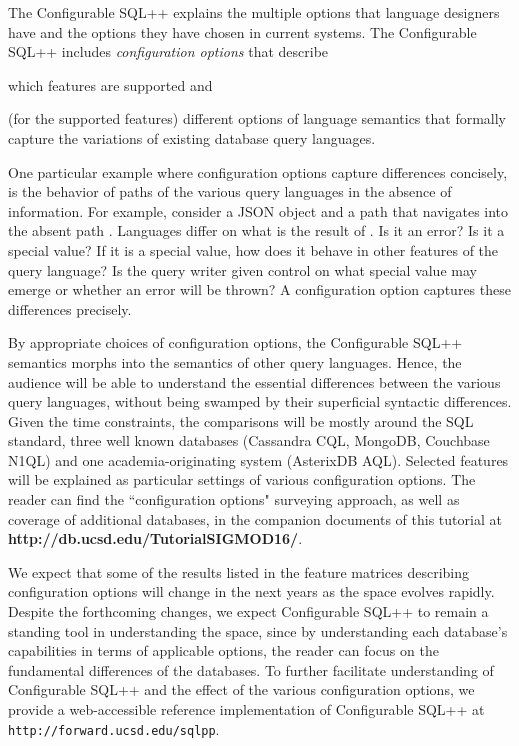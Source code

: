 The Configurable SQL++ explains the multiple options that language designers have and the options they have chosen in current systems. The Configurable SQL++ includes {\em configuration options} that describe 
\begin{compact_enum}
\item which features are supported and 
\item (for the supported features) different options of language semantics that formally capture the variations of existing database query languages. 
\end{compact_enum}

One particular example where configuration options capture differences concisely, is the behavior of paths of the various query languages in the absence of information. For example, consider a JSON object  and a path that navigates into the absent path . Languages differ on what is the result of . Is it an error? Is it a special value? If it is a special value, how does it behave in other features of the query language? Is the query writer given control on what special value may emerge or whether an error will be thrown? A configuration option captures these differences precisely. 

By appropriate choices of configuration options, the Configurable SQL++ semantics morphs into the semantics of other query languages. Hence, the audience will be able to understand the essential differences between the various query languages, without being swamped by their superficial syntactic differences. Given the time constraints, the comparisons will be mostly around the SQL standard, three well known databases (Cassandra CQL, MongoDB, Couchbase N1QL) and one academia-originating system (AsterixDB AQL). Selected features will be explained as particular settings of various configuration options. The reader can find the ``configuration options" surveying approach, as well as coverage of additional databases, in the companion documents of this tutorial at \textbf{http://db.ucsd.edu/TutorialSIGMOD16/}.  

We expect that some of the results listed in the feature matrices describing configuration options will change in the next years as the space evolves rapidly.
Despite the forthcoming changes, we expect Configurable SQL++ to remain a standing tool in understanding the space, since by understanding each database's capabilities in terms of applicable options, the reader can focus on the fundamental differences of the databases. To further facilitate understanding of Configurable SQL++ and the effect of the various configuration options, we provide a web-accessible reference implementation of Configurable SQL++ at \texttt{http://forward.ucsd.edu/sqlpp}.

